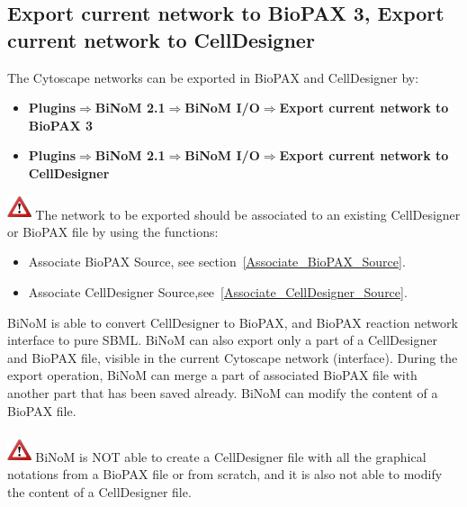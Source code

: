 \subsection{Export current network to BioPAX 3, Export current network to CellDesigner} \label{Export_current_network}
The Cytoscape networks can be exported in BioPAX and CellDesigner by:
\begin{itemize}
\item \textbf{Plugins$\Rightarrow$BiNoM 2.1$\Rightarrow$BiNoM I/O$\Rightarrow$Export current network to BioPAX 3}
\item \textbf{Plugins$\Rightarrow$BiNoM 2.1$\Rightarrow$BiNoM I/O$\Rightarrow$Export current network to CellDesigner}
\end{itemize}
\includegraphics[width=20pt,height=20pt]{graphics/warning} The network to be exported should be associated to an existing CellDesigner or BioPAX file by using the functions:
\begin{itemize}
\item Associate BioPAX Source, see section~\ref{Associate_BioPAX_Source}.
\item Associate CellDesigner Source,see~\ref{Associate_CellDesigner_Source}.
\end{itemize}
BiNoM is able to convert CellDesigner to BioPAX, and BioPAX
reaction network interface to pure SBML. BiNoM can also export only a
part of a CellDesigner and BioPAX file, visible in the current Cytoscape network
(interface). During the export operation, BiNoM can merge a part of
associated BioPAX file with another part that has been saved already. BiNoM can modify the
content of a BioPAX file. \\\\

\includegraphics[width=20pt,height=20pt]{graphics/warning} BiNoM is NOT able to
create a CellDesigner file with all the graphical notations from a BioPAX file or from
scratch, and it is also not able to modify the content of a CellDesigner file.\\\\

